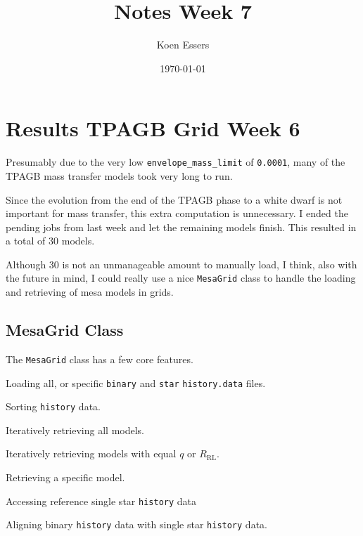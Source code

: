 \documentclass[a4paper,10pt]{article}
\title{Notes Week 7}
\author{Koen Essers}
\date{\today}
\begin{document}
\setuplayout
\section{Results TPAGB Grid Week 6}

Presumably due to the very low \lstinline[style=output, breaklines=true]|envelope_mass_limit| of \lstinline[style=output, breaklines=true]|0.0001|, many of the TPAGB mass transfer models took very long to run.

Since the evolution from the end of the TPAGB phase to a white dwarf is not important for mass transfer, this extra computation is unnecessary.
I ended the pending jobs from last week and let the remaining models finish. This resulted in a total of 30 models.

Although 30 is not an unmanageable amount to manually load, I think, also with the future in mind, I could really use a nice \lstinline[style=output, breaklines=true]|MesaGrid| class to handle the loading and retrieving of mesa models in grids.

\subsection{MesaGrid Class}

The \lstinline[style=output, breaklines=true]|MesaGrid| class has a few core features.
\begin{citemize}
    \item Loading all, or specific \lstinline[style=output, breaklines=true]|binary| and \lstinline[style=output, breaklines=true]|star| \lstinline[style=output, breaklines=true]|history.data| files.
    \item Sorting \lstinline[style=output, breaklines=true]|history| data.
    \item Iteratively retrieving all models.
    \item Iteratively retrieving models with equal \(q\) or \(R_\text{RL}\).
    \item Retrieving a specific model.
    \item Accessing reference single star \lstinline[style=output, breaklines=true]|history| data
    \item Aligning binary \lstinline[style=output, breaklines=true]|history| data with single star \lstinline[style=output, breaklines=true]|history| data.
\end{citemize}
\end{document}
